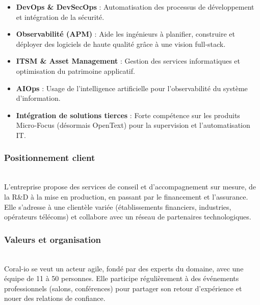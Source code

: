 \documentclass[12pt,a4paper]{report}
\begin{document}
\begin{itemize}

 \item \textbf{DevOps \& DevSecOps} : Automatisation des processus de développement et intégration de la sécurité.

 \item \textbf{Observabilité (APM)} : Aide les ingénieurs à planifier, construire et déployer des logiciels de haute qualité grâce à une vision full‑stack.

 \item \textbf{ITSM \& Asset Management} : Gestion des services informatiques et optimisation du patrimoine applicatif.

 \item \textbf{AIOps} : Usage de l’intelligence artificielle pour l’observabilité du système d’information.

 \item \textbf{Intégration de solutions tierces} : Forte compétence sur les produits Micro‑Focus (désormais OpenText) pour la supervision et l’automatisation IT.

\end{itemize}



\vspace{0.2cm}

\subsubsection{Positionnement client}\\

L’entreprise propose des services de conseil et d’accompagnement sur mesure, de la R\&D à la mise en production, en passant par le financement et l’assurance. Elle s’adresse à une clientèle variée (établissements financiers, industries, opérateurs télécoms) et collabore avec un réseau de partenaires technologiques.



\vspace{0.2cm}

\subsubsection{Valeurs et organisation}\\

Coral-io se veut un acteur agile, fondé par des experts du domaine, avec une équipe de 11 à 50 personnes. Elle participe régulièrement à des événements professionnels (salons, conférences) pour partager son retour d’expérience et nouer des relations de confiance.
\end{document}
